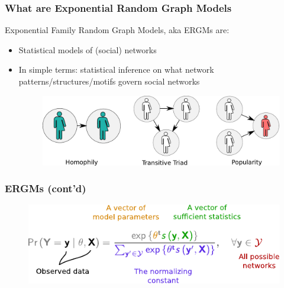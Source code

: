 \documentclass[aspectratio=169, 9pt]{beamer}\usepackage[]{graphicx}\usepackage[]{color}
\begin{document}
\begin{frame}
\frametitle{What are Exponential Random Graph Models}

Exponential Family Random Graph Models, aka \alert{ERGMs} are:\pause

\begin{itemize}[<+->]
\item Statistical models of (social) networks
\item In simple terms: statistical inference on what network patterns/structures/motifs
govern social networks
\begin{figure}
\includegraphics[width=.6\linewidth]{friendly-terms.pdf}
\end{figure}
\end{itemize}

\end{frame}

\begin{frame}[label=ergmeq]
\frametitle{ERGMs (cont'd)}
\begin{figure}
\centering
\includegraphics[width=.7\linewidth]{parts-of-ergm.pdf}
\end{figure}


\end{frame}
\end{document}
